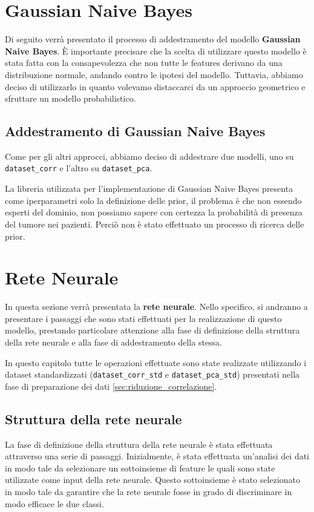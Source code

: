 \newpage

\section{Gaussian Naive Bayes}
Di seguito verrà presentato il processo di addestramento del modello
\textbf{Gaussian Naive Bayes}. È importante precisare che la scelta di utilizzare
questo modello è stata fatta con la consapevolezza che non tutte le features
derivano da una distribuzione normale, andando contro le ipotesi del modello.
Tuttavia, abbiamo deciso di utilizzarlo in quanto volevamo distaccarci da un
approccio geometrico e sfruttare un modello probabilistico.
\subsection{Addestramento di Gaussian Naive Bayes}
Come per gli altri approcci, abbiamo deciso di addestrare due modelli, uno su
\texttt{dataset\_corr} e l'altro su \texttt{dataset\_pca}.

La libreria utilizzata per l'implementazione di Gaussian Naive Bayes
presenta come iperparametri solo la definizione delle prior, il problema è che non
essendo esperti del dominio, non possiamo sapere con certezza la probabilità
di presenza del tumore nei pazienti. Perciò non è stato effettuato un processo di
ricerca delle prior.
\section{Rete Neurale}
In questa sezione verrà presentata la \textbf{rete neurale}. Nello specifico, si
andranno a presentare i passaggi che sono stati effettuati per la realizzazione
di questo modello, prestando particolare attenzione alla fase di definizione
della struttura della rete neurale e alla fase di addestramento della stessa.

In questo capitolo tutte le operazioni effettuate sono state realizzate
utilizzando i dataset standardizzati (\texttt{dataset\_corr\_std} e
\texttt{dataset\_pca\_std}) presentati nella fase di preparazione dei
dati \ref{sec:riduzione_correlazione}.
\subsection{Struttura della rete neurale}
La fase di definizione della struttura della rete neurale è stata effettuata
attraverso una serie di passaggi. Inizialmente, è stata effettuata un'analisi
dei dati in modo tale da selezionare un sottoinsieme di feature le quali sono
state utilizzate come input della rete neurale. Questo sottoinsieme è stato
selezionato in modo tale da garantire che la rete neurale fosse in grado di
discriminare in modo efficace le due classi.


